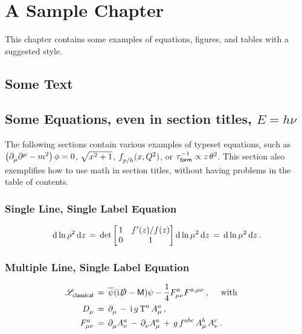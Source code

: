 \chapter{A Sample Chapter}
\label{chapter:SampleChapter}

This chapter contains some examples of equations, figures, and tables with a suggested style.

\section{Some Text}

\lipsum[3]

\section{Some Equations, even in section titles, \texorpdfstring{$E = h \nu$}{E = h ν}}

The following sections contain various examples of typeset equations, such as $\left(\partial_{\mu}^{}\partial_{}^{\mu} - m_{}^{2}\right) \phi = 0$, $\sqrt{x_{}^{2} + 1}$, $f_{p/h}^{}(x, Q_{}^{2})$, or $\tau^{-1}_{\sf form} \propto z \,\theta_{}^{2}$. This section also exemplifies how to use math in section titles, without having problems in the table of contents.


\subsection{Single Line, Single Label Equation}

\begin{align}
	{\rm d} \ln \rho_{}^{2} \, {\rm d} z
	\,=\,
	{\rm det}
	\begin{bmatrix}
		\,1 & f'(z) / f(z) \\
		\,0 & 1
	\end{bmatrix} 
	{\rm d} \ln \mu_{}^{2} \, {\rm d} z
	\,=\,
	{\rm d} \ln \mu_{}^{2} \, {\rm d} z
	\,.
\end{align}

\subsection{Multiple Line, Single Label Equation}

\begin{align} \begin{split}
	\mathscr{L}_{\textsf{classical}}^{} \,&=\, 
	\overline{\psi} ( {\rm i} \slashed{D} - {\sf M} ) \psi - \frac{1}{4} F^{a}_{\mu\nu} F^{a,\mu\nu}_{} \,,
	\quad\textrm{ with }\quad\\
	D_{\mu}^{} \,&=\, \partial_{\mu}^{} \,-\, {\rm i}\,g\, \textrm{T}_{}^{a} \, A^{a}_{\mu} \,,\\
	F^{a}_{\mu\nu} \,&=\, \partial_{\mu}^{} A^{a}_{\nu} \,-\, \partial_{\nu}^{} A^{a}_{\mu}
	\,+\, g\, f_{}^{abc}\,A^{b}_{\mu}\,A^{c}_{\nu}\,.
\end{split} \end{align}

